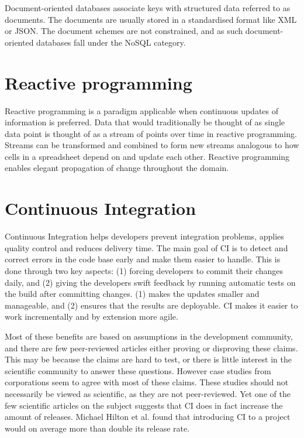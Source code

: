 Document-oriented databases associate keys with structured data referred to as documents. The documents are usually stored in a standardised format like \acrshort{XML} or \acrshort{JSON}\cite[p.~9]{nosql-ntnu}. The document schemes are not constrained, and as such document-oriented databases fall under the \acrshort{NoSQL} category.

\section{Reactive programming}
Reactive programming is a paradigm applicable when continuous updates of information is preferred. Data that would traditionally be thought of as single data point is thought of as a stream of points over time in reactive programming. Streams can be transformed and combined to form new streams analogous to how cells in a spreadsheet depend on and update each other. Reactive programming enables elegant propagation of change throughout the domain.

\section{Continuous Integration}
Continuous Integration helps developers prevent integration problems, applies quality control and reduces delivery time. The main goal of \gls{CI} is to detect and correct errors in the code base early and make them easier to handle. This is done through two key aspects: (1) forcing developers to commit their changes daily, and (2) giving the developers swift feedback by running automatic tests on the build after committing changes. (1) makes the updates smaller and manageable, and (2) ensures that the results are deployable. \acrshort{CI} makes it easier to work incrementally and by extension more agile.

Most of these benefits are based on assumptions in the development community, and there are few peer-reviewed articles either proving or disproving these claims. This may be because the claims are hard to test, or there is little interest in the scientific community to answer these questions. However case studies from corporations seem to agree with most of these claims. These studies should not necessarily be viewed as scientific, as they are not peer-reviewed. Yet one of the few scientific articles on the subject suggests that \acrshort{CI} does in fact increase the amount of releases. Michael Hilton et al. found that introducing \acrshort{CI} to a project would on average more than double its release rate.

